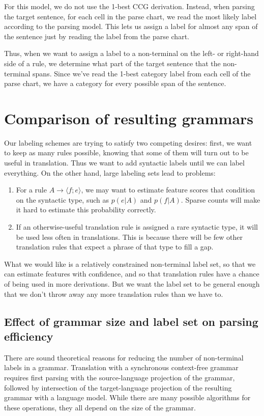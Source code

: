 \documentclass[a4paper]{article}
\begin{document}
For this model, we do not use the 1-best CCG derivation. Instead, when parsing the target sentence, for each cell in the parse chart, we read the most likely label according to the parsing model. This lets us assign a label for almost any span of the sentence just by reading the label from the parse chart.

Thus, when we want to assign a label to a non-terminal on the left- or right-hand side of a rule, we determine what part of the target sentence that the non-terminal spans. Since we've read the 1-best category label from each cell of the parse chart, we have a category for every possible span of the sentence.

\section{Comparison of resulting grammars}
\label{sec:comparison}

Our labeling schemes are trying to satisfy two competing desires: first, we want to keep as many rules possible, knowing that some of them will turn out to be useful in translation. Thus we want to add syntactic labels until we can label everything. On the other hand, large labeling sets lead to problems:
\begin{enumerate}
\item For a rule $A \to \langle f ; e \rangle$, we may want to estimate feature scores that condition on the syntactic type, such as $p(e|A)$ and $p(f|A)$. Sparse counts will make it hard to estimate this probability correctly.
\item If an otherwise-useful translation rule is assigned a rare syntactic type, it will be used less often in translations. This is because there will be few other translation rules that expect a phrase of that type to fill a gap.
\end{enumerate}
What we would like is a relatively constrained non-terminal label set, so that we can estimate features with confidence, and so that translation rules have a chance of being used in more derivations. But we want the label set to be general enough that we don't throw away any more translation rules than we have to.


\subsection{Effect of grammar size and label set on parsing efficiency}

There are sound theoretical reasons for reducing the number of non-terminal labels in a grammar. Translation with a synchronous context-free grammar requires first parsing with the source-language projection of the grammar, followed by intersection of the target-language projection of the resulting grammar with a language model. While there are many possible algorithms for these operations, they all depend on the size of the grammar.
\end{document}

